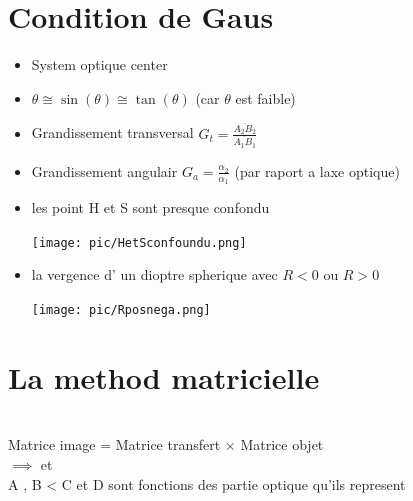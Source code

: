 \documentclass[12pt]{book}
\begin{document}
        \section{Condition de Gaus}
            \begin{itemize}
                \item  System optique center
                \item $\theta \cong \sin(\theta) \cong \tan(\theta)$ (car $\theta $ est faible)
                \item Grandissement transversal $G_t              = \frac{\overline{A_2B_2}}{\overline{A_1B_1}}$
                \item Grandissement angulair $G_a = \frac{\alpha_2}{\alpha_1}$ (par raport a laxe optique)\\
                    \begin{center}
                    \end{center}
                \item  les point H et S sont presque confondu \\ \begin{center}
                    \texttt{[image: pic/HetSconfoundu.png]}
                \end{center}
                \item la vergence d' un dioptre spherique  avec $R < 0 $ ou $ R >0$ 
                \begin{center}
                    \texttt{[image: pic/Rposnega.png]}
                \end{center}
            \end{itemize}
        \section{La method matricielle}
            \begin{center}
                 \\
                Matrice image = Matrice transfert $\times$ Matrice objet \\ 
                $ \implies$ et  \\
                A , B < C et D sont fonctions des partie optique qu'ils represent

            \end{center}
\end{document}
